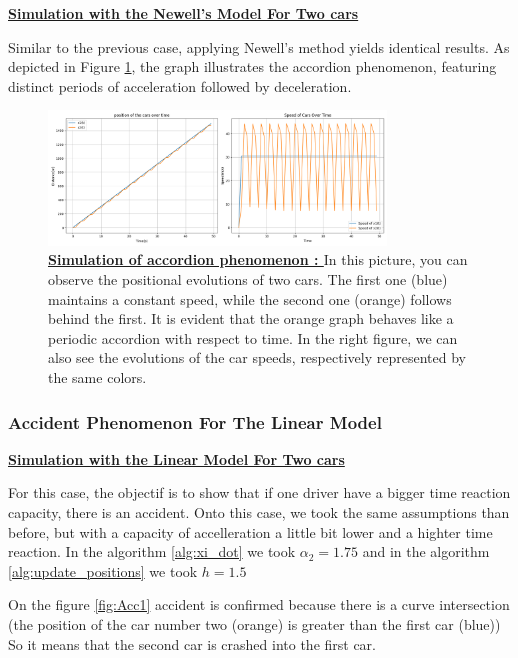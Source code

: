 \documentclass{article}
\begin{document}
		\textbf{\underline{Simulation with the Newell's Model For Two cars}} \newline\newline
		
		Similar to the previous case, applying Newell's method yields identical results. As depicted in Figure \ref{fig:1W2_ACCORD}, the graph illustrates the accordion phenomenon, featuring distinct periods of acceleration followed by deceleration.
		
		\begin{figure}[H]
			\centering
			\includegraphics[width=0.8\textwidth]{1W2_Accord.png}
			\caption[Simulation of accordion phenomenon]{\textbf{\underline{Simulation of accordion phenomenon : }} In this picture, you can observe the positional evolutions of two cars. The first one (blue) maintains a constant speed, while the second one (orange) follows behind the first. It is evident that the orange graph behaves like a periodic accordion with respect to time. In the right figure, we can also see the evolutions of the car speeds, respectively represented by the same colors.}
			\label{fig:1W2_ACCORD}
		\end{figure}
		
			
		\subsubsection{Accident Phenomenon For The Linear Model }
		
		\textbf{\underline{Simulation with the Linear Model For Two cars}} \newline\newline
		
		For this case, the objectif is to show that if one driver have a bigger time reaction capacity, there is an accident.
		Onto this case, we took the same assumptions than before, but with a capacity of accelleration a little bit lower and a highter time reaction. In the algorithm \ref{alg:xi_dot} we took $\alpha_2=1.75$ and in the algorithm \ref{alg:update_positions} we took $h=1.5$
		
		On the figure \ref{fig:Acc1} accident is confirmed because there is a curve intersection (the position of the car number two (orange) is greater than the first car (blue)) So it means that the second car is crashed into the first car.
		
\end{document}
